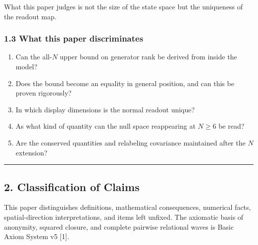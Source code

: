 \documentclass[
  a4paper,
]{article}
\providecommand{\tightlist}{%
  \setlength{\itemsep}{0pt}\setlength{\parskip}{0pt}}
\begin{document}
What this paper judges is not the size of the state space but the
uniqueness of the readout map.

\subsubsection{1.3 What this paper
discriminates}\label{what-this-paper-discriminates}

\begin{enumerate}
\def\labelenumi{\arabic{enumi}.}
\tightlist
\item
  Can the all-\(N\) upper bound on generator rank be derived from inside
  the model?
\item
  Does the bound become an equality in general position, and can this be
  proven rigorously?
\item
  In which display dimensions is the normal readout unique?
\item
  As what kind of quantity can the null space reappearing at \(N\ge6\)
  be read?
\item
  Are the conserved quantities and relabeling covariance maintained
  after the \(N\) extension?
\end{enumerate}

\begin{center}\rule{0.5\linewidth}{0.5pt}\end{center}

\subsection{2. Classification of Claims}\label{classification-of-claims}

This paper distinguishes definitions, mathematical consequences,
numerical facts, spatial-direction interpretations, and items left
unfixed. The axiomatic basis of anonymity, squared closure, and complete
pairwise relational waves is Basic Axiom System v5 {[}1{]}.
\end{document}
